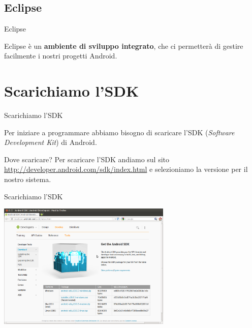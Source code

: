 \documentclass[xcolor=svgnames,11pt]{beamer}
\begin{document}
\subsection{Eclipse}
\begin{frame}{Eclipse}

Eclipse \`e un \textbf{ambiente di sviluppo integrato}, che ci permetter\`a di gestire facilmente i nostri progetti Android.

\pause
\begin{center}
\end{center}

\end{frame}


\section{Scarichiamo l'SDK}

\begin{frame}{Scarichiamo l'SDK}

Per iniziare a programmare abbiamo bisogno di scaricare l'SDK (\emph{Software Development Kit}) di Android.
\pause
\medskip
\begin{block}{Dove scaricare?}
Per scaricare l'SDK andiamo sul sito \url{http://developer.android.com/sdk/index.html} e selezioniamo la versione per il nostro sistema.
\end{block}
\end{frame}

\begin{frame}{Scarichiamo l'SDK}
\begin{center}
\includegraphics[height=6cm]{sdk.png}
\end{center}
\end{frame}
\end{document}
